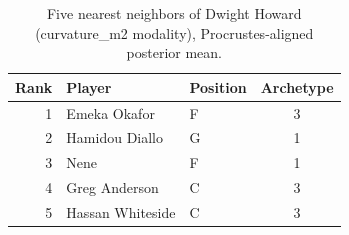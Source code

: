 \begin{table}[htbp]
  \centering\small
  \begin{tabular}{rllc}
    \toprule
    Rank & Player & Position & Archetype \\
    \midrule
    1 & Emeka Okafor & F & 3 \\
    2 & Hamidou Diallo & G & 1 \\
    3 & Nene & F & 1 \\
    4 & Greg Anderson & C & 3 \\
    5 & Hassan Whiteside & C & 3 \\
    \bottomrule
  \end{tabular}
  \caption{Five nearest neighbors of Dwight Howard (curvature_m2 modality), Procrustes-aligned posterior mean.}
  \label{tab:Dwight_Howard_neighbors_curvature_m2}
\end{table}


